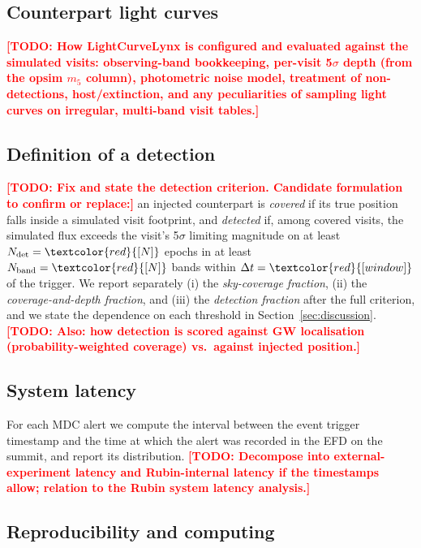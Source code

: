 \documentclass[OPS,lsstdraft,authoryear,toc]{lsstdoc}
\newcommand{\tbd}[1]{\textcolor{red}{[#1]}}
\newcommand{\todo}[1]{\textcolor{red}{\textbf{[TODO: #1]}}}
\newcommand{\mdc}{MDC\xspace}
\begin{document}
\subsection{Counterpart light curves}\label{sec:lc_methods}

\todo{How LightCurveLynx is configured and evaluated against the simulated visits: observing-band bookkeeping, per-visit 5$\sigma$ depth (from the opsim $m_5$ column), photometric noise model, treatment of non-detections, host/extinction, and any peculiarities of sampling light curves on irregular, multi-band visit tables.}

\subsection{Definition of a detection}\label{sec:detection}

\todo{Fix and state the detection criterion. Candidate formulation to confirm or replace:}
an injected counterpart is \emph{covered} if its true position falls inside a simulated visit footprint,
and \emph{detected} if, among covered visits, the simulated flux exceeds the visit's 5$\sigma$ limiting
magnitude on at least $N_{\rm det}=\tbd{N}$ epochs in at least $N_{\rm band}=\tbd{N}$ bands within
$\Delta t=\tbd{window}$ of the trigger. We report separately
(i) the \emph{sky-coverage fraction}, (ii) the \emph{coverage-and-depth fraction}, and (iii) the \emph{detection fraction}
after the full criterion, and we state the dependence on each threshold in Section~\ref{sec:discussion}.
\todo{Also: how detection is scored against GW localisation (probability-weighted coverage) vs.\ against injected position.}

\subsection{System latency}\label{sec:latency}

For each \mdc{} alert we compute the interval between the event trigger timestamp and the time at
which the alert was recorded in the EFD on the summit, and report its distribution.
\todo{Decompose into external-experiment latency and Rubin-internal latency if the timestamps allow; relation to the Rubin system latency analysis.}

\subsection{Reproducibility and computing}\label{sec:compute}
\end{document}

